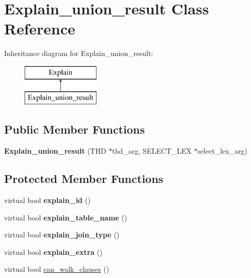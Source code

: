 \hypertarget{classExplain__union__result}{}\section{Explain\+\_\+union\+\_\+result Class Reference}
\label{classExplain__union__result}
Inheritance diagram for Explain\+\_\+union\+\_\+result\+:\begin{figure}[H]
\begin{center}
\leavevmode
\includegraphics[height=2.000000cm]{classExplain__union__result}
\end{center}
\end{figure}
\subsection*{Public Member Functions}
\begin{DoxyCompactItemize}
\item 
\mbox{\label{classExplain__union__result_a58074d53ee719e9aa5e59b9b71935af5}} 
{\bfseries Explain\+\_\+union\+\_\+result} (T\+HD $\ast$thd\+\_\+arg, S\+E\+L\+E\+C\+T\+\_\+\+L\+EX $\ast$select\+\_\+lex\+\_\+arg)
\end{DoxyCompactItemize}
\subsection*{Protected Member Functions}
\begin{DoxyCompactItemize}
\item 
\mbox{\label{classExplain__union__result_a4b0245d95901da2967a83d5b62bcde8b}} 
virtual bool {\bfseries explain\+\_\+id} ()
\item 
\mbox{\label{classExplain__union__result_acc5afd025d41ae3d405f8a5f03bbcddc}} 
virtual bool {\bfseries explain\+\_\+table\+\_\+name} ()
\item 
\mbox{\label{classExplain__union__result_ae716570af3a023e525c208af2723c8bf}} 
virtual bool {\bfseries explain\+\_\+join\+\_\+type} ()
\item 
\mbox{\label{classExplain__union__result_a47af9f54512900ea81337271cb8f8a11}} 
virtual bool {\bfseries explain\+\_\+extra} ()
\item 
virtual bool \mbox{\hyperlink{classExplain__union__result_a5c825b2170b63e866d0694bb29ee1535}{can\+\_\+walk\+\_\+clauses}} ()
\end{DoxyCompactItemize}
